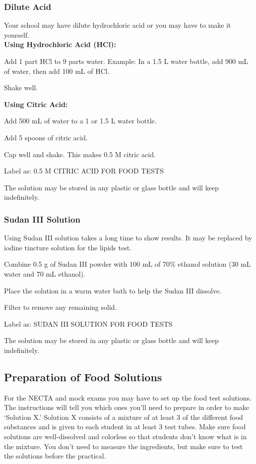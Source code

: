 \subsubsection{Dilute Acid}
Your school may have dilute hydrochloric acid or you may have to make it yourself.\\

\textbf{Using Hydrochloric Acid (HCl):}
\begin{itemize*}
\item Add 1 part HCl to 9 parts water. Example: In a 1.5 L water bottle, add 900 mL of water, then add 100 mL of HCl.
\item Shake well.
\end{itemize*}

\textbf{Using Citric Acid:}
\begin{itemize*}
\item Add 500 mL of water to a 1 or 1.5 L water bottle.
\item Add 5 spoons of citric acid.
\item Cap well and shake. This makes 0.5 M citric acid.
\end{itemize*}

\noindent Label as: 0.5 M CITRIC ACID FOR FOOD TESTS

\noindent The solution may be stored in any plastic or glass bottle and will keep indefinitely.

\subsubsection{Sudan III Solution}
Using Sudan III solution takes a long time to show results. It may be replaced by iodine tincture solution for the lipids test.

\begin{itemize*}
\item Combine 0.5 g of Sudan III powder with 100 mL of 70\% ethanol solution (30 mL water and 70 mL ethanol).
\item Place the solution in a warm water bath to help the Sudan III dissolve.
\item Filter to remove any remaining solid.
\end{itemize*}

\noindent Label as: SUDAN III SOLUTION FOR FOOD TESTS

\noindent The solution may be stored in any plastic or glass bottle and will keep indefinitely.


\subsection{Preparation of Food Solutions}
For the NECTA and mock exams you may have to set up the food test solutions. The instructions will tell you which ones you'll need to prepare in order to make `Solution X.' Solution X consists of a mixture of at least 3 of the different food substances and is given to each student in at least 3 test tubes. Make sure food solutions are well-dissolved and colorless so that students don't know what is in the mixture. You don't need to measure the ingredients, but make sure to test the solutions before the practical.

